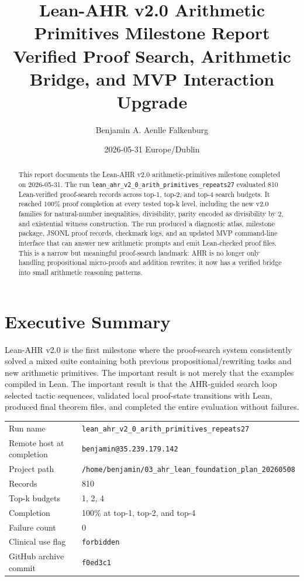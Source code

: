 \documentclass[11pt]{article}
\title{\textbf{Lean-AHR v2.0 Arithmetic Primitives Milestone Report}\\
\large Verified Proof Search, Arithmetic Bridge, and MVP Interaction Upgrade}
\author{Benjamin A. Aenlle Falkenburg}
\date{2026-05-31 Europe/Dublin}
\begin{document}
\maketitle

\begin{abstract}
This report documents the Lean-AHR v2.0 arithmetic-primitives milestone completed on 2026-05-31. The run
\texttt{lean\_ahr\_v2\_0\_arith\_primitives\_repeats27} evaluated 810 Lean-verified proof-search records across
top-1, top-2, and top-4 search budgets. It reached 100\% proof completion at every tested top-k level, including
the new v2.0 families for natural-number inequalities, divisibility, parity encoded as divisibility by 2, and
existential witness construction. The run produced a diagnostic atlas, milestone package, JSONL proof records,
checkmark logs, and an updated MVP command-line interface that can answer new arithmetic prompts and emit
Lean-checked proof files. This is a narrow but meaningful proof-search landmark: AHR is no longer only handling
propositional micro-proofs and addition rewrites; it now has a verified bridge into small arithmetic reasoning
patterns.
\end{abstract}

\tableofcontents
\newpage

\section{Executive Summary}

Lean-AHR v2.0 is the first milestone where the proof-search system consistently solved a mixed suite containing
both previous propositional/rewriting tasks and new arithmetic primitives. The important result is not merely that
the examples compiled in Lean. The important result is that the AHR-guided search loop selected tactic sequences,
validated local proof-state transitions with Lean, produced final theorem files, and completed the entire evaluation
without failures.

\begin{center}
\begin{tabular}{ll}
\toprule
Run name & \texttt{lean\_ahr\_v2\_0\_arith\_primitives\_repeats27} \\
Remote host at completion & \texttt{benjamin@35.239.179.142} \\
Project path & \texttt{/home/benjamin/03\_ahr\_lean\_foundation\_plan\_20260508} \\
Records & 810 \\
Top-k budgets & 1, 2, 4 \\
Completion & 100\% at top-1, top-2, and top-4 \\
Failure count & 0 \\
Clinical use flag & \texttt{forbidden} \\
GitHub archive commit & \texttt{f0ed3c1} \\
\bottomrule
\end{tabular}
\end{center}
\end{document}
